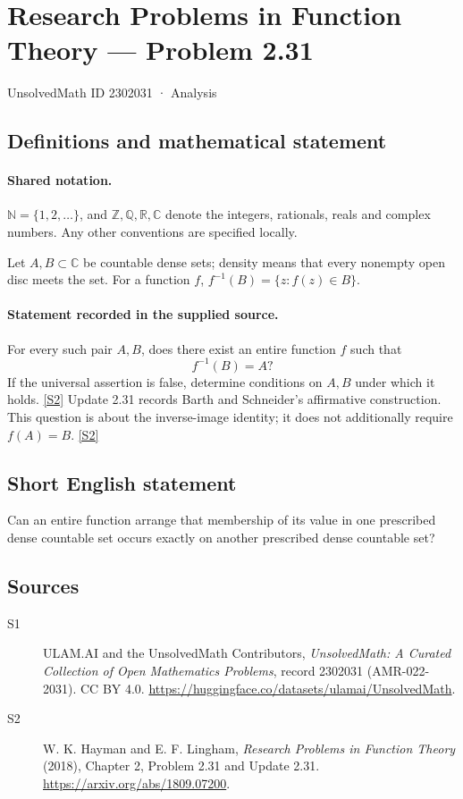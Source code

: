 \documentclass[11pt]{article}
\newcommand{\sref}[2]{\hyperlink{source:#1:#2}{[S#2]}}
\begin{document}
\setcounter{section}{2302030}
\section{Research Problems in Function Theory — Problem 2.31}\label{2302031}
{\small\sffamily UnsolvedMath ID 2302031 · Analysis}
\subsection{Definitions and mathematical statement}

\paragraph{Shared notation.}$\mathbb N=\{1,2,\ldots\}$, and $\mathbb Z,\mathbb Q,\mathbb R,\mathbb C$ denote the integers, rationals, reals and complex numbers. Any other conventions are specified locally.


Let $A,B\subset\mathbb C$ be countable dense sets; density means that every nonempty open disc meets the set. For a function $f$, $f^{-1}(B)=\{z:f(z)\in B\}$.

\paragraph{Statement recorded in the supplied source.}
For every such pair $A,B$, does there exist an entire function $f$ such that
\[f^{-1}(B)=A?\]
If the universal assertion is false, determine conditions on $A,B$ under which it holds. \sref{2302031}{2}
Update 2.31 records Barth and Schneider's affirmative construction. This question is about the inverse-image identity; it does not additionally require $f(A)=B$. \sref{2302031}{2}
\subsection{Short English statement}
Can an entire function arrange that membership of its value in one prescribed dense countable set occurs exactly on another prescribed dense countable set?
\subsection{Sources}
\begin{description}
\item[\hypertarget{source:2302031:1}{S1}] ULAM.AI and the UnsolvedMath Contributors, \emph{UnsolvedMath: A Curated Collection of Open Mathematics Problems}, record 2302031 (AMR-022-2031). CC BY 4.0. \url{https://huggingface.co/datasets/ulamai/UnsolvedMath}.
\item[\hypertarget{source:2302031:2}{S2}] W. K. Hayman and E. F. Lingham, \emph{Research Problems in Function Theory} (2018), Chapter 2, Problem 2.31 and Update 2.31. \url{https://arxiv.org/abs/1809.07200}.
\end{description}
\label{end:2302031}
\end{document}
